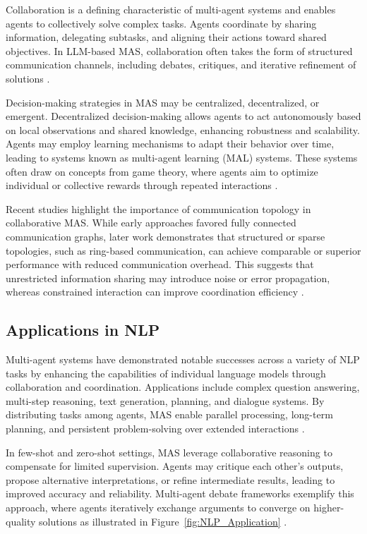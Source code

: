 Collaboration is a defining characteristic of multi-agent systems and enables agents to collectively solve complex tasks. Agents coordinate by sharing information, delegating subtasks, and aligning their actions toward shared objectives. In LLM-based MAS, collaboration often takes the form of structured communication channels, including debates, critiques, and iterative refinement of solutions \cite{wang2025rethinkingmultiagentintelligencelens}.

Decision-making strategies in MAS may be centralized, decentralized, or emergent. Decentralized decision-making allows agents to act autonomously based on local observations and shared knowledge, enhancing robustness and scalability. Agents may employ learning mechanisms to adapt their behavior over time, leading to systems known as multi-agent learning (MAL) systems. These systems often draw on concepts from game theory, where agents aim to optimize individual or collective rewards through repeated interactions \cite{app9071402}.

Recent studies highlight the importance of communication topology in collaborative MAS. While early approaches favored fully connected communication graphs, later work demonstrates that structured or sparse topologies, such as ring-based communication, can achieve comparable or superior performance with reduced communication overhead. This suggests that unrestricted information sharing may introduce noise or error propagation, whereas constrained interaction can improve coordination efficiency \cite{wang2025rethinkingmultiagentintelligencelens}.

\subsection{Applications in NLP}

Multi-agent systems have demonstrated notable successes across a variety of NLP tasks by enhancing the capabilities of individual language models through collaboration and coordination. Applications include complex question answering, multi-step reasoning, text generation, planning, and dialogue systems. By distributing tasks among agents, MAS enable parallel processing, long-term planning, and persistent problem-solving over extended interactions \cite{tran2025multiagentcollaborationmechanismssurvey}.

In few-shot and zero-shot settings, MAS leverage collaborative reasoning to compensate for limited supervision. Agents may critique each other’s outputs, propose alternative interpretations, or refine intermediate results, leading to improved accuracy and reliability. Multi-agent debate frameworks exemplify this approach, where agents iteratively exchange arguments to converge on higher-quality solutions as illustrated in Figure~\ref{fig:NLP_Application} \cite{wei2023chainofthoughtpromptingelicitsreasoning}.

